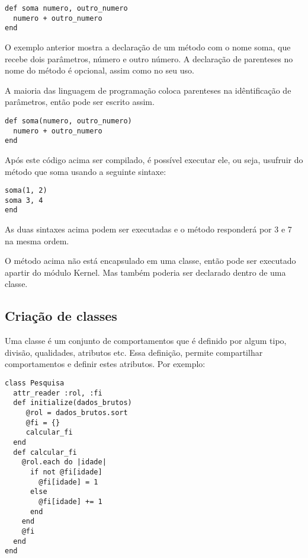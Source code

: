 \documentclass[espaco=simples,appendix=Name]{abnt}
\begin{document}
\begin{lstlisting}[caption=implementando um método de soma]
def soma numero, outro_numero
  numero + outro_numero
end
\end{lstlisting}

O exemplo anterior mostra a declaração de um método com o nome soma, que recebe dois parâmetros, número e outro número. A declaração de parenteses no nome do método é opcional, assim como no seu uso. 

A maioria das linguagem de programação coloca parenteses na idêntificação de parâmetros, então pode ser escrito assim.

\begin{lstlisting}[caption=implementando um método de soma usando parenteses alternativo]
def soma(numero, outro_numero)
  numero + outro_numero
end
\end{lstlisting}

Após este código acima ser compilado, é possível executar ele, ou seja, usufruir do método que soma usando a seguinte sintaxe:

\begin{lstlisting}[caption=usufruindo do método de soma]
soma(1, 2)
soma 3, 4
end
\end{lstlisting}

As duas sintaxes acima podem ser executadas e o método responderá por 3 e 7 na mesma ordem.

O método acima não está encapsulado em uma classe, então pode ser executado apartir do módulo Kernel. Mas também poderia ser declarado dentro de uma classe.

\subsection{Criação de classes}

Uma classe é um conjunto de comportamentos que é definido por algum tipo, divisão, qualidades, atributos etc. Essa definição, permite compartilhar comportamentos e definir estes atributos. Por exemplo:

\begin{lstlisting}[caption=Criando uma classe, label=classePesquisa]
class Pesquisa
  attr_reader :rol, :fi
  def initialize(dados_brutos)
     @rol = dados_brutos.sort
     @fi = {}
     calcular_fi
  end
  def calcular_fi
    @rol.each do |idade|
      if not @fi[idade]
        @fi[idade] = 1
      else
        @fi[idade] += 1
      end
    end
    @fi
  end
end
\end{lstlisting}
\end{document}
